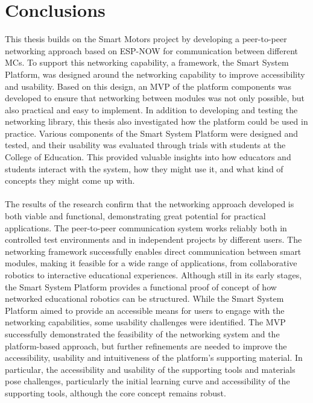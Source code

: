 \cleardoublepage%
\chapter{\label{chap:con}Conclusions}%

This thesis builds on the Smart Motors project \citep{dahal_designing_2024} by developing a peer-to-peer networking approach based on ESP-NOW for communication between different MCs. To support this networking capability, a framework, the Smart System Platform, was designed around the networking capability to improve accessibility and usability. Based on this design, an MVP of the platform components was developed to ensure that networking between modules was not only possible, but also practical and easy to implement. 
In addition to developing and testing the networking library, this thesis also investigated how the platform could be used in practice. Various components of the Smart System Platform were designed and tested, and their usability was evaluated through trials with students at the College of Education. This provided valuable insights into how educators and students interact with the system, how they might use it, and what kind of concepts they might come up with. \\\\

The results of the research confirm that the networking approach developed is both viable and functional, demonstrating great potential for practical applications. The peer-to-peer communication system works reliably both in controlled test environments and in independent projects by different users. The networking framework successfully enables direct communication between smart modules, making it feasible for a wide range of applications, from collaborative robotics to interactive educational experiences.
Although still in its early stages, the Smart System Platform provides a functional proof of concept of how networked educational robotics can be structured. While the Smart System Platform aimed to provide an accessible means for users to engage with the networking capabilities, some usability challenges were identified. The MVP successfully demonstrated the feasibility of the networking system and the platform-based approach, but further refinements are needed to improve the accessibility, usability and intuitiveness of the platform's supporting material. In particular, the accessibility and usability of the supporting tools and materials pose challenges, particularly the initial learning curve and accessibility of the supporting tools, although the core concept remains robust. \\\\

